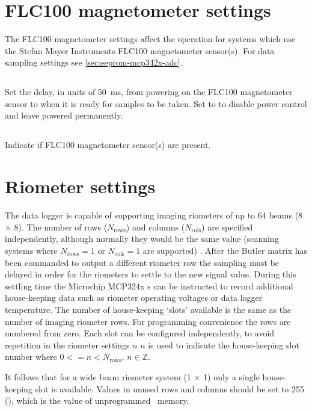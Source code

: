 \section{FLC100 magnetometer settings}

The FLC100 magnetometer settings affect the operation for systems
which use the Stefan Mayer Instruments FLC100 magnetometer
sensor(s). For data sampling settings see
\ref{sec:eeprom-mcp342x-adc}.

\subsection[flc100-power-up-delay-50ms]{}
Set the delay, in units of \SI{50}{\milli\second}, from powering on
the FLC100 magnetometer sensor to when it is ready for samples to be
taken. Set to  to disable power control and leave powered
permanently.

\subsection[flc100-present]{}
Indicate if FLC100 magnetometer sensor(s) are present.

\section{Riometer settings}
The data logger is capable of supporting imaging riometers of up to 64
beams (8 \ensuremath{\times} 8). The number of rows
($N_\mathrm{rows}$) and columns ($N_\mathrm{cols}$) are specified
independently, although normally they would be the same value
(scanning systems where $N_\mathrm{rows} = 1$ or $N_\mathrm{cols} = 1$
are supported) . After the Butler matrix has been commanded to output
a different riometer row the sampling must be delayed in order for the
riometers to settle to the new signal value. During this settling time
the Microchip MCP324x \adc s can be instructed to record additional
house-keeping data such as riometer operating voltages or data logger
temperature. The number of house-keeping `slots' available is the same
as the number of imaging riometer rows. For programming convenience
the rows are numbered from zero. Each slot can be configured
independently, to avoid repetition in the riometer settings $n$ $n$ is
used to indicate the house-keeping slot number where
$0 <= n < N_\mathrm{rows}$, $n \in \mathbb{Z}$.

It follows that for a wide beam riometer system (1 \ensuremath{\times}
1) only a single house-keeping slot is available. Values in unused rows and
columns should be set to 255 (), which is the value of
unprogrammed \eeprom\ memory.

